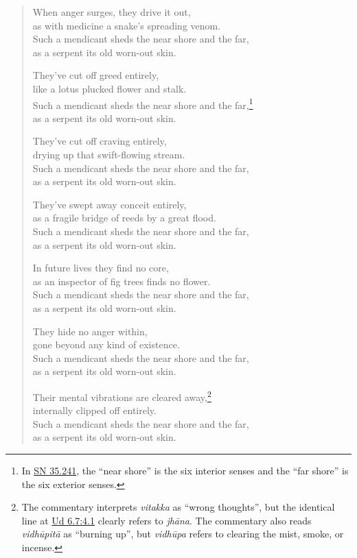 \documentclass[12pt,openany]{book}%
\begin{document}
\begin{verse}%
When anger surges, they drive it out, \\
as with medicine a snake’s spreading venom. \\
Such a mendicant sheds the near shore and the far, \\
as a serpent its old worn-out skin. 

They’ve cut off greed entirely, \\
like a lotus plucked flower and stalk. \\
Such a mendicant sheds the near shore and the far,\footnote{In \href{https://suttacentral.net/sn35.241/en/sujato}{SN 35.241}, the “near shore” is the six interior senses and the “far shore” is the six exterior senses. } \\
as a serpent its old worn-out skin. 

They’ve cut off craving entirely, \\
drying up that swift-flowing stream. \\
Such a mendicant sheds the near shore and the far, \\
as a serpent its old worn-out skin. 

They’ve swept away conceit entirely, \\
as a fragile bridge of reeds by a great flood. \\
Such a mendicant sheds the near shore and the far, \\
as a serpent its old worn-out skin. 

In future lives they find no core, \\
as an inspector of fig trees finds no flower. \\
Such a mendicant sheds the near shore and the far, \\
as a serpent its old worn-out skin. 

They hide no anger within, \\
gone beyond any kind of existence. \\
Such a mendicant sheds the near shore and the far, \\
as a serpent its old worn-out skin. 

Their mental vibrations are cleared away,\footnote{The commentary interprets \textit{vitakka} as “wrong thoughts”, but the identical line at \href{https://suttacentral.net/ud6.7/en/sujato\#4.1}{Ud 6.7:4.1} clearly refers to \textit{\textsanskrit{jhāna}}. The commentary also reads \textit{\textsanskrit{vidhūpitā}} as “burning up”, but \textit{\textsanskrit{vidhūpa}} refers to clearing the mist, smoke, or incense. } \\
internally clipped off entirely. \\
Such a mendicant sheds the near shore and the far, \\
as a serpent its old worn-out skin. 


\end{verse}
\end{document}
